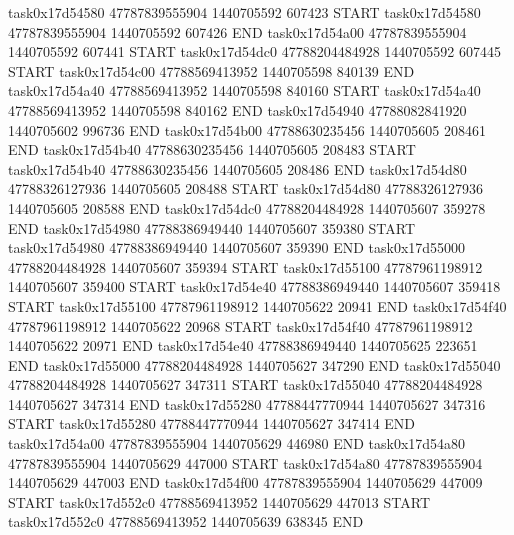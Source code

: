 task0x17d54580 47787839555904          1440705592               607423  START
task0x17d54580 47787839555904          1440705592               607426  END
task0x17d54a00 47787839555904          1440705592               607441  START
task0x17d54dc0 47788204484928          1440705592               607445  START
task0x17d54c00 47788569413952          1440705598               840139  END
task0x17d54a40 47788569413952          1440705598               840160  START
task0x17d54a40 47788569413952          1440705598               840162  END
task0x17d54940 47788082841920          1440705602               996736  END
task0x17d54b00 47788630235456          1440705605               208461  END
task0x17d54b40 47788630235456          1440705605               208483  START
task0x17d54b40 47788630235456          1440705605               208486  END
task0x17d54d80 47788326127936          1440705605               208488  START
task0x17d54d80 47788326127936          1440705605               208588  END
task0x17d54dc0 47788204484928          1440705607               359278  END
task0x17d54980 47788386949440          1440705607               359380  START
task0x17d54980 47788386949440          1440705607               359390  END
task0x17d55000 47788204484928          1440705607               359394  START
task0x17d55100 47787961198912          1440705607               359400  START
task0x17d54e40 47788386949440          1440705607               359418  START
task0x17d55100 47787961198912          1440705622                20941  END
task0x17d54f40 47787961198912          1440705622                20968  START
task0x17d54f40 47787961198912          1440705622                20971  END
task0x17d54e40 47788386949440          1440705625               223651  END
task0x17d55000 47788204484928          1440705627               347290  END
task0x17d55040 47788204484928          1440705627               347311  START
task0x17d55040 47788204484928          1440705627               347314  END
task0x17d55280 47788447770944          1440705627               347316  START
task0x17d55280 47788447770944          1440705627               347414  END
task0x17d54a00 47787839555904          1440705629               446980  END
task0x17d54a80 47787839555904          1440705629               447000  START
task0x17d54a80 47787839555904          1440705629               447003  END
task0x17d54f00 47787839555904          1440705629               447009  START
task0x17d552c0 47788569413952          1440705629               447013  START
task0x17d552c0 47788569413952          1440705639               638345  END
